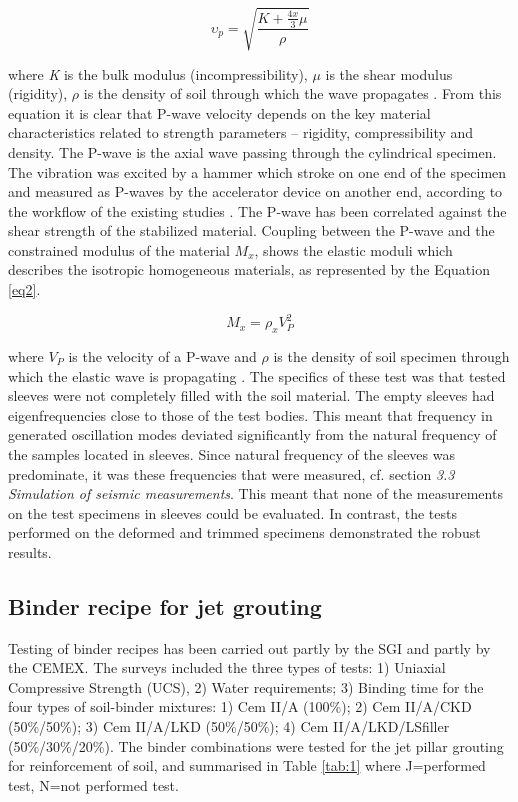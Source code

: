 \documentclass[USenglish,twocolumn]{article}
\begin{document}
\begin{equation} \label{eq2}
	\upsilon_p=\sqrt{\frac{K+\frac{4x}{3}\mu}{\rho} }
\end{equation}

where \emph{K} is the bulk modulus (incompressibility), $\mu$ is the shear modulus (rigidity), $\rho$ is the density of soil through which the wave propagates \cite{Fowler}. From this equation it is clear that P-wave velocity depends on the key material characteristics related to strength parameters -- rigidity, compressibility and density. The P-wave is the axial wave passing through the cylindrical specimen. The vibration was excited by a hammer which stroke on one end of the specimen and measured as P-waves by the accelerator device on another end, according to the workflow of the existing studies \cite{ma15217798}. The P-wave has been correlated against the shear strength of the stabilized material. Coupling between the P-wave and the constrained modulus of the material $M_x$, shows the elastic moduli which describes the isotropic homogeneous materials, as represented by the Equation \ref{eq2}.

\begin{equation} \label{eq2}
	M_x=\rho_x V_P^2
\end{equation}

where $V_P$ is the velocity of a P-wave and $\rho$ is the density of soil specimen through which the elastic wave is propagating \cite{Mavko}. The specifics of these test was that tested sleeves were not completely filled with the soil material. The empty sleeves had eigenfrequencies close to those of the test bodies. This meant that frequency in generated oscillation modes deviated significantly from the natural frequency of the samples located in sleeves. Since natural frequency of the sleeves was predominate, it was these frequencies that were measured, cf. section \emph{3.3 Simulation of seismic measurements}. This meant that none of the measurements on the test specimens in sleeves could be evaluated. In contrast, the tests performed on the deformed and trimmed specimens demonstrated the robust results.

\subsection{Binder recipe for jet grouting}
Testing of binder recipes has been carried out partly by the SGI and partly by the CEMEX. The surveys included the three types of tests: 1) Uniaxial Compressive Strength (UCS), 2) Water requirements; 3) Binding time for the four types of soil-binder mixtures: 1) Cem II/A (100\%); 2) Cem II/A/CKD (50\%/50\%); 3) Cem II/A/LKD (50\%/50\%); 4) Cem II/A/LKD/LSfiller (50\%/30\%/20\%). The binder combinations were tested for the jet pillar grouting for reinforcement of soil, and summarised in Table \ref{tab:1} where J=performed test, N=not performed test.
\end{document}
